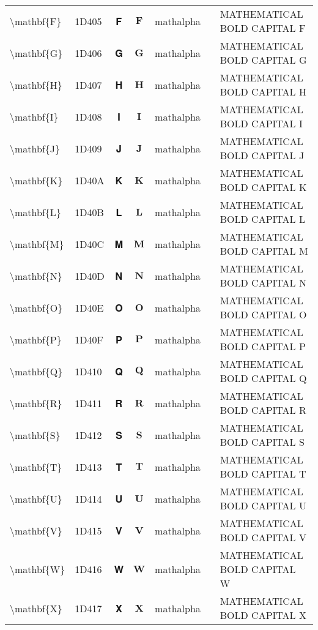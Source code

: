 \documentclass[a4paper,landscape]{article}
\begin{document}
\begin{longtable}{llcclll}
\textbackslash{}mathbf\{F\} & 1D405 & 𝐅 & $\mathbf{F}$ & mathalpha &  & MATHEMATICAL BOLD CAPITAL F \\
\textbackslash{}mathbf\{G\} & 1D406 & 𝐆 & $\mathbf{G}$ & mathalpha &  & MATHEMATICAL BOLD CAPITAL G \\
\textbackslash{}mathbf\{H\} & 1D407 & 𝐇 & $\mathbf{H}$ & mathalpha &  & MATHEMATICAL BOLD CAPITAL H \\
\textbackslash{}mathbf\{I\} & 1D408 & 𝐈 & $\mathbf{I}$ & mathalpha &  & MATHEMATICAL BOLD CAPITAL I \\
\textbackslash{}mathbf\{J\} & 1D409 & 𝐉 & $\mathbf{J}$ & mathalpha &  & MATHEMATICAL BOLD CAPITAL J \\
\textbackslash{}mathbf\{K\} & 1D40A & 𝐊 & $\mathbf{K}$ & mathalpha &  & MATHEMATICAL BOLD CAPITAL K \\
\textbackslash{}mathbf\{L\} & 1D40B & 𝐋 & $\mathbf{L}$ & mathalpha &  & MATHEMATICAL BOLD CAPITAL L \\
\textbackslash{}mathbf\{M\} & 1D40C & 𝐌 & $\mathbf{M}$ & mathalpha &  & MATHEMATICAL BOLD CAPITAL M \\
\textbackslash{}mathbf\{N\} & 1D40D & 𝐍 & $\mathbf{N}$ & mathalpha &  & MATHEMATICAL BOLD CAPITAL N \\
\textbackslash{}mathbf\{O\} & 1D40E & 𝐎 & $\mathbf{O}$ & mathalpha &  & MATHEMATICAL BOLD CAPITAL O \\
\textbackslash{}mathbf\{P\} & 1D40F & 𝐏 & $\mathbf{P}$ & mathalpha &  & MATHEMATICAL BOLD CAPITAL P \\
\textbackslash{}mathbf\{Q\} & 1D410 & 𝐐 & $\mathbf{Q}$ & mathalpha &  & MATHEMATICAL BOLD CAPITAL Q \\
\textbackslash{}mathbf\{R\} & 1D411 & 𝐑 & $\mathbf{R}$ & mathalpha &  & MATHEMATICAL BOLD CAPITAL R \\
\textbackslash{}mathbf\{S\} & 1D412 & 𝐒 & $\mathbf{S}$ & mathalpha &  & MATHEMATICAL BOLD CAPITAL S \\
\textbackslash{}mathbf\{T\} & 1D413 & 𝐓 & $\mathbf{T}$ & mathalpha &  & MATHEMATICAL BOLD CAPITAL T \\
\textbackslash{}mathbf\{U\} & 1D414 & 𝐔 & $\mathbf{U}$ & mathalpha &  & MATHEMATICAL BOLD CAPITAL U \\
\textbackslash{}mathbf\{V\} & 1D415 & 𝐕 & $\mathbf{V}$ & mathalpha &  & MATHEMATICAL BOLD CAPITAL V \\
\textbackslash{}mathbf\{W\} & 1D416 & 𝐖 & $\mathbf{W}$ & mathalpha &  & MATHEMATICAL BOLD CAPITAL W \\
\textbackslash{}mathbf\{X\} & 1D417 & 𝐗 & $\mathbf{X}$ & mathalpha &  & MATHEMATICAL BOLD CAPITAL X \\

\end{longtable}
\end{document}
